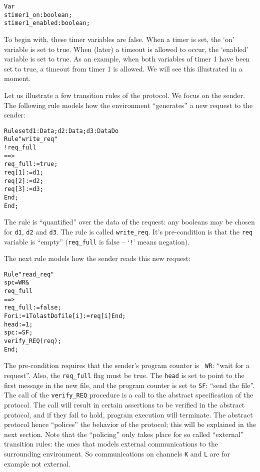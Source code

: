 \begin{alltt}
  Var
    stimer1_on      : boolean;
    stimer1_enabled : boolean;
\end{alltt}

To begin with, these timer variables are false.  When  a timer is set,
the `on' variable is set to true. When (later) a timeout is allowed to
occur, the `enabled' variable is set to true. As an example, when both
variables of timer 1 have been set to true,  a timeout from timer 1 is
allowed. We will see this illustrated in a moment.

Let us illustrate a few transition rules of the  protocol. We focus on
the sender.  The following rule models how the environment ``generates''
a new request to the sender:

\begin{alltt}
  Ruleset d1 : Data; d2 : Data; d3 : Data Do
    Rule "write_req" 
      !req_full
        ==>
      req_full := true;
      req[1] := d1;
      req[2] := d2;
      req[3] := d3;
    End;
  End;
\end{alltt}

The  rule  is ``quantified''  over the data of the request: any booleans
may  be chosen  for  {\tt d1},  {\tt d2} and {\tt d3}. The  rule is
called  {\tt  write\_req}. It's pre-condition is  that the  {\tt req}
variable is ``empty'' ({\tt req\_full} is false -- `{\tt !}' means negation).

The next rule models how the sender reads this new request:

\begin{alltt}
  Rule "read_req" 
    spc = WR &
    req_full
      ==>
    req_full := false;
    For i := 1 To last Do file[i] := req[i] End;
    head := 1;
    spc := SF;
    verify_REQ(req);
  End;
\end{alltt}

The  pre-condition requires that  the sender's program counter is {\tt
WR}:  ``wait  for a request''.  Also,  the  {\tt req\_full} flag must be
true.  The {\tt head} is set to point to the first  message in the new
file, and the program counter is  set to {\tt  SF}: ``send the file''.
The call of the {\tt verify\_REQ} procedure is  a call to the abstract
specification  of the protocol.    The   call will result in   certain
assertions to be verified  in the abstract protocol,  and if they fail
to hold, program  execution   will terminate.  The abstract   protocol
hence ``polices'' the behavior of  the protocol; this will be explained
in the  next section. Note that  the  ``policing'' only takes  place for
so called ``external'' transition  rules:  the ones that  models external
communications to  the surrounding  environment. So communications  on
channels {\tt K} and {\tt L} are for example not external.

